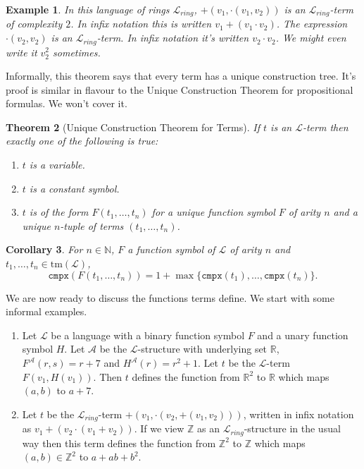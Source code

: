 \documentclass[11pt]{article}
\newcommand{\tm}{\textrm{tm}}
\newcommand{\cmpx}{\texttt{cmpx}}
\newtheorem{theorem}{Theorem}[section]
\newtheorem{example}[theorem]{Example}
\newtheorem{cor}[theorem]{Corollary}
\newcommand{\mcal}[1]{\mathcal{#1}}
\newcommand{\R}{\mathbb{R}}
\newcommand{\Z}{\mathbb{Z}}
\newcommand{\N}{\mathbb{N}}
\begin{document}
\begin{example}
In this language of rings $\mcal{L}_{ring}$, $+(v_1,\cdot(v_1,v_2))$ is an $\mcal{L}_{ring}$-term of complexity $2$. In infix notation this is written $v_1+(v_1\cdot v_2)$. The expression $\cdot(v_2,v_2)$ is an $\mcal{L}_{ring}$-term. In infix notation it's written $v_2\cdot v_2$. We might even write it $v_2^2$ sometimes.
\end{example}


Informally, this theorem says that every term has a unique construction tree. It's proof is similar in flavour to the Unique Construction Theorem for propositional formulas. We won't cover it.

\begin{theorem}[Unique Construction Theorem for Terms]\label{UniConTerms}
If $t$ is an $\mcal{L}$-term then exactly one of the following is true:
\begin{enumerate}
\item $t$ is a variable.
\item $t$ is a constant symbol.
\item $t$ is of the form $F(t_1,\ldots,t_n)$ for a unique function symbol $F$ of arity $n$ and a unique $n$-tuple of terms $(t_1,\ldots,t_n)$.
\end{enumerate}
\end{theorem}


\begin{cor}
For $n\in\N$, $F$ a function symbol of $\mcal{L}$ of arity $n$ and $t_1,\ldots,t_n\in \tm(\mcal{L})$,
\[\cmpx(F(t_1,\ldots,t_n))=1+\max\{\cmpx(t_1),\ldots,\cmpx(t_n)\}.\]
\end{cor}

We are now ready to discuss the functions terms define. We start with some informal examples.

\begin{enumerate}
\item Let $\mcal{L}$ be a language with a binary function symbol $F$ and a unary function symbol $H$. Let $\mcal{A}$ be the $\mcal{L}$-structure with underlying set $\R$, $F^\mcal{A}(r,s)=r+7$ and $H^\mcal{A}(r)=r^2+1$. Let $t$ be the $\mcal{L}$-term $F(v_1,H(v_1))$. Then $t$ defines the function from $\R^2$ to $\R$ which maps $(a,b)$ to $a+7$.
\item
Let $t$ be the $\mcal{L}_{ring}$-term $+(v_1,\cdot (v_2,+(v_1,v_2)))$, written in infix notation as $v_1+(v_2\cdot(v_1+v_2))$. If we view $\Z$ as an $\mcal{L}_{ring}$-structure in the usual way then this term defines the function from $\Z^2$ to $\Z$ which maps $(a,b)\in\Z^{2}$ to $a+ab+b^2$.
\end{enumerate}
\end{document}
